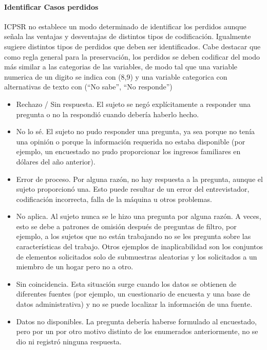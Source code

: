 \documentclass[
  14pt,
]{book}
\begin{document}
\hypertarget{identificar-casos-perdidos}{%
\paragraph{Identificar Casos perdidos}\label{identificar-casos-perdidos}}

ICPSR no establece un modo determinado de identificar los perdidos aunque señala las ventajas y desventajas de distintos tipos de codificación. Igualmente sugiere distintos tipos de perdidos que deben ser identificados. Cabe destacar que como regla general para la preservación, los perdidos se deben codificar del modo más similar a las categorias de las variables, de modo tal que una variable numerica de un digito se indica con (8,9) y una variable categorica con alternativas de texto con (``No sabe'', ``No responde'')

\begin{itemize}
\item
  Rechazo / Sin respuesta. El sujeto se negó explícitamente a responder una pregunta o no la respondió cuando debería haberlo hecho.
\item
  No lo sé. El sujeto no pudo responder una pregunta, ya sea porque no tenía una opinión o porque la información requerida no estaba disponible (por ejemplo, un encuestado no pudo proporcionar los ingresos familiares en dólares del año anterior).
\item
  Error de proceso. Por alguna razón, no hay respuesta a la pregunta, aunque el sujeto proporcionó una. Esto puede resultar de un error del entrevistador, codificación incorrecta, falla de la máquina u otros problemas.
\item
  No aplica. Al sujeto nunca se le hizo una pregunta por alguna razón. A veces, esto se debe a patrones de omisión después de preguntas de filtro, por ejemplo, a los sujetos que no están trabajando no se les pregunta sobre las características del trabajo. Otros ejemplos de inaplicabilidad son los conjuntos de elementos solicitados solo de submuestras aleatorias y los solicitados a un miembro de un hogar pero no a otro.
\item
  Sin coincidencia. Esta situación surge cuando los datos se obtienen de diferentes fuentes (por ejemplo, un cuestionario de encuesta y una base de datos administrativa) y no se puede localizar la información de una fuente.
\item
  Datos no disponibles. La pregunta debería haberse formulado al encuestado, pero por un por otro motivo distinto de los enumerados anteriormente, no se dio ni registró ninguna respuesta.
\end{itemize}
\end{document}
